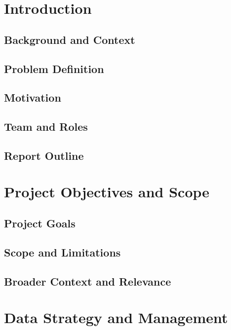 \documentclass[11pt,a4paper]{article}
\begin{document}
\tableofcontents
\newpage

\section{Introduction}

\subsection{Background and Context}

\subsection{Problem Definition}

\subsection{Motivation}

\subsection{Team and Roles}

\subsection{Report Outline}

\section{Project Objectives and Scope}

\subsection{Project Goals}

\subsection{Scope and Limitations}

\subsection{Broader Context and Relevance}


\section{Data Strategy and Management}
\end{document}

